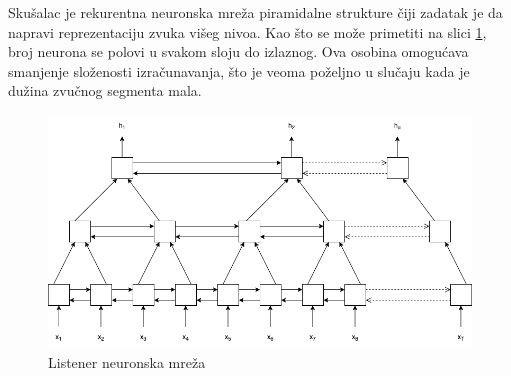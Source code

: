 \documentclass[a4paper]{article}
\begin{document}
Skušalac je rekurentna neuronska mreža piramidalne strukture čiji zadatak je da napravi reprezentaciju zvuka višeg nivoa. 
Kao što se može primetiti na slici \ref{fig:listener_model}, broj neurona se polovi u svakom sloju do izlaznog.
Ova osobina omogućava smanjenje složenosti izračunavanja, što je veoma poželjno u slučaju kada je dužina zvučnog segmenta mala.
\begin{figure}[h!]
  \begin{center}
    \includegraphics[scale=0.3]{listener.png}
  \end{center}
  \caption{Listener neuronska mreža}
  \label{fig:listener_model}
\end{figure}
\end{document}
